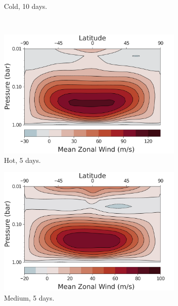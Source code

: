 \begin{figure}
\begin{subfigure}[b]{0.32\textwidth}
    \caption{Cold, 10 days.}
  \end{subfigure}
    \\
    \begin{subfigure}[b]{0.32\textwidth}
      \includegraphics[width=\textwidth]{figures/eqm-zonal-flow/wind-hot-5.pdf}
      \caption{Hot, 5 days.}
    \end{subfigure}
    \begin{subfigure}[b]{0.32\textwidth}
      \includegraphics[width=\textwidth]{figures/eqm-zonal-flow/wind-med-5.pdf}
      \caption{Medium, 5 days.}
    \end{subfigure}
    \begin{subfigure}[b]{0.32\textwidth}

\end{subfigure}
\end{figure}
